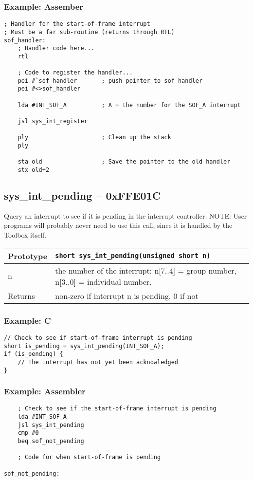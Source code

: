 \subsubsection*{Example: Assember}
\begin{verbatim}
; Handler for the start-of-frame interrupt
; Must be a far sub-routine (returns through RTL)
sof_handler:
    ; Handler code here...
    rtl

    ; Code to register the handler...
    pei #`sof_handler       ; push pointer to sof_handler
    pei #<>sof_handler

    lda #INT_SOF_A          ; A = the number for the SOF_A interrupt
	
    jsl sys_int_register

    ply                     ; Clean up the stack
    ply

    sta old                 ; Save the pointer to the old handler
    stx old+2
\end{verbatim}

\subsection*{sys\_int\_pending -- 0xFFE01C}
Query an interrupt to see if it is pending in the interrupt controller.
NOTE: User programs will probably never need to use this call, since it is handled by the Toolbox itself.

\bigskip

\begin{tabular}{|l||l|} \hline
Prototype & \lstinline!short sys_int_pending(unsigned short n)! \\ \hline
n & the number of the interrupt: n[7..4] = group number, n[3..0] = individual number. \\ \hline
Returns & non-zero if interrupt n is pending, 0 if not \\ \hline
\end{tabular}

\subsubsection*{Example: C}
\begin{lstlisting}
// Check to see if start-of-frame interrupt is pending
short is_pending = sys_int_pending(INT_SOF_A);
if (is_pending) {
	// The interrupt has not yet been acknowledged
}
\end{lstlisting}

\subsubsection*{Example: Assembler}
\begin{verbatim}
    ; Check to see if the start-of-frame interrupt is pending
    lda #INT_SOF_A
    jsl sys_int_pending
    cmp #0
    beq sof_not_pending

    ; Code for when start-of-frame is pending

sof_not_pending:
\end{verbatim}

